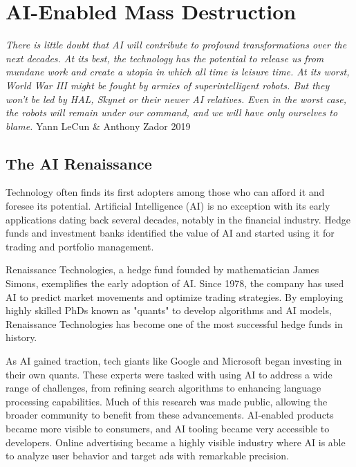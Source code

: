 \setchapterpreamble[u]{\margintoc}
\chapter{AI-Enabled Mass Destruction}

\textit{There is little doubt that AI will contribute to profound transformations over the next decades. At its best, the technology has the potential to release us from mundane work and create a utopia in which all time is leisure time. At its worst, World War III might be fought by armies of superintelligent robots. But they won’t be led by HAL, Skynet or their newer AI relatives. Even in the worst case, the robots will remain under our command, and we will have only ourselves to blame.} Yann LeCun \& Anthony Zador 2019 \cite{dontfearterminator}


\section{The AI Renaissance}

Technology often finds its first adopters among those who can afford it and foresee its potential. Artificial Intelligence (AI) is no exception with its early applications dating back several decades, notably in the financial industry. Hedge funds and investment banks identified the value of AI and started using it for trading and portfolio management.

Renaissance Technologies, a hedge fund founded by mathematician James Simons, exemplifies the early adoption of AI. Since 1978, the company has used AI to predict market movements and optimize trading strategies. By employing highly skilled PhDs known as "quants" to develop algorithms and AI models, Renaissance Technologies has become one of the most successful hedge funds in history.

As AI gained traction, tech giants like Google and Microsoft began investing in their own quants. These experts were tasked with using AI to address a wide range of challenges, from refining search algorithms to enhancing language processing capabilities. Much of this research was made public, allowing the broader community to benefit from these advancements. AI-enabled products became more visible to consumers, and AI tooling became very accessible to developers. Online advertising became a highly visible industry where AI is able to analyze user behavior and target ads with remarkable precision.

